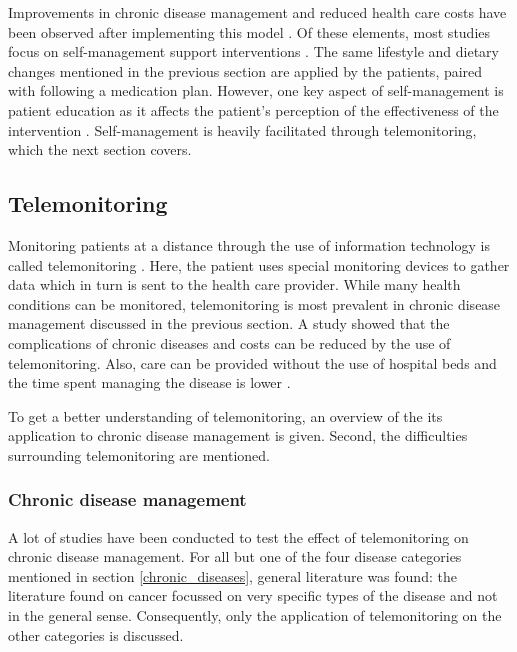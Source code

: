         \noindent Improvements in chronic disease management and reduced health care costs have been observed after implementing this model \cite{bodenheimer2002improving_2}. Of these elements, most studies focus on self-management support interventions \cite{reynolds2018systematic}. The same lifestyle and dietary changes mentioned in the previous section are applied by the patients, paired with following a medication plan. However, one key aspect of self-management is patient education as it affects the patient's perception of the effectiveness of the intervention \cite{wallace2010influence}. Self-management is heavily facilitated through telemonitoring, which the next section covers.

    \subsection{Telemonitoring} \label{2_telemonitoring}
    Monitoring patients at a distance through the use of information technology is called telemonitoring \cite{systematic_review}. Here, the patient uses special monitoring devices to gather data which in turn is sent to the health care provider. While many health conditions can be monitored, telemonitoring is most prevalent in chronic disease management discussed in the previous section. A study showed that the complications of chronic diseases and costs can be reduced by the use of telemonitoring. Also, care can be provided without the use of hospital beds and the time spent managing the disease is lower \cite{telemonitoring_current_state}.

    To get a better understanding of telemonitoring, an overview of the its application to chronic disease management is given. Second, the difficulties surrounding telemonitoring are mentioned.

        \subsubsection{Chronic disease management}
        A lot of studies have been conducted to test the effect of telemonitoring on chronic disease management. For all but one of the four disease categories mentioned in section \ref{chronic_diseases}, general literature was found: the literature found on cancer focussed on very specific types of the disease and not in the general sense. Consequently, only the application of telemonitoring on the other categories is discussed.

